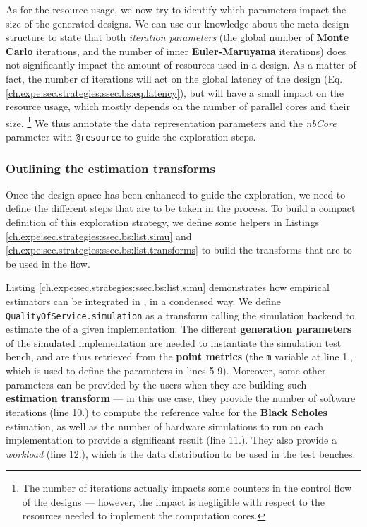                 As for the resource usage, we now try to identify which parameters impact the size of the generated designs.
                We can use our knowledge about the meta design structure to state that both {\it iteration parameters} (the global number of {\bf Monte Carlo} iterations, and the number of inner {\bf Euler-Maruyama} iterations) does not significantly impact the amount of resources used in a design.
                As a matter of fact, the number of iterations will act on the global latency of the design (Eq. \ref{ch.expe:sec.strategies:ssec.bs:eq.latency}), but will have a small impact on the resource usage, which mostly depends on the number of parallel cores and their size.%
                \footnote{The number of iterations actually impacts some counters in the control flow of the designs --- however, the impact is negligible with respect to the resources needed to implement the computation cores.}
                We thus annotate the data representation parameters and the {\it nbCore} parameter with \lstinline{@resource} to guide the exploration steps.

\clearpage
\vspace{-0.5cm}
            \subsubsection{Outlining the estimation transforms}
                Once the design space has been enhanced to guide the exploration, we need to define the different steps that are to be taken in the process.
                To build a compact definition of this exploration strategy, we define some helpers in Listings \ref{ch.expe:sec.strategies:ssec.bs:list.simu} and \ref{ch.expe:sec.strategies:ssec.bs:list.transforms} to build the transforms that are to be used in the flow.

                Listing \ref{ch.expe:sec.strategies:ssec.bs:list.simu} demonstrates how empirical  estimators can be integrated in , in a condensed way.
                We define \lstinline{QualityOfService.simulation} as a transform calling the simulation backend to estimate the  of a given implementation.
                The different {\bf generation parameters} of the simulated implementation are needed to instantiate the simulation test bench, and are thus retrieved from the {\bf point metrics} (the \lstinline{m} variable at line 1., which is used to define the parameters in lines 5-9).
                Moreover, some other parameters can be provided by the users when they are building such {\bf estimation transform} --- \eg in this use case, they provide the number of software iterations (line 10.) to compute the reference value for the {\bf Black Scholes} estimation, as well as the number of hardware simulations to run on each implementation to provide a significant result (line 11.).
                They also provide a {\it workload} (line 12.), which is the data distribution to be used in the test benches.

